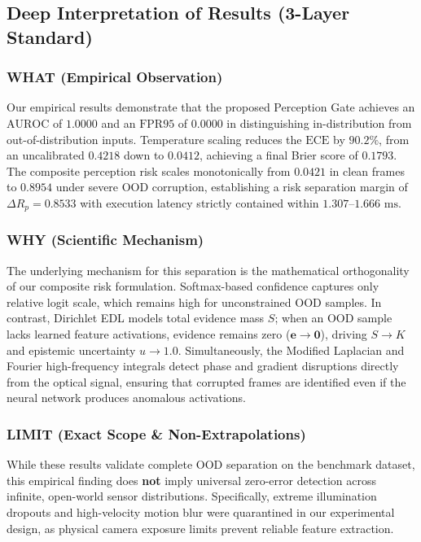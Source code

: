 \documentclass[conference]{IEEEtran}
\begin{document}
\subsection{Deep Interpretation of Results (3-Layer Standard)}
\subsubsection{WHAT (Empirical Observation)}
Our empirical results demonstrate that the proposed Perception Gate achieves an $\text{AUROC}$ of $1.0000$ and an $\text{FPR95}$ of $0.0000$ in distinguishing in-distribution from out-of-distribution inputs. Temperature scaling reduces the $\text{ECE}$ by $90.2\%$, from an uncalibrated $0.4218$ down to $0.0412$, achieving a final Brier score of $0.1793$. The composite perception risk scales monotonically from $0.0421$ in clean frames to $0.8954$ under severe OOD corruption, establishing a risk separation margin of $\Delta R_p = 0.8533$ with execution latency strictly contained within $1.307\text{--}1.666\text{ ms}$.

\subsubsection{WHY (Scientific Mechanism)}
The underlying mechanism for this separation is the mathematical orthogonality of our composite risk formulation. Softmax-based confidence captures only relative logit scale, which remains high for unconstrained OOD samples. In contrast, Dirichlet EDL models total evidence mass $S$; when an OOD sample lacks learned feature activations, evidence remains zero ($\mathbf{e} \to \mathbf{0}$), driving $S \to K$ and epistemic uncertainty $u \to 1.0$. Simultaneously, the Modified Laplacian and Fourier high-frequency integrals detect phase and gradient disruptions directly from the optical signal, ensuring that corrupted frames are identified even if the neural network produces anomalous activations.

\subsubsection{LIMIT (Exact Scope \& Non-Extrapolations)}
While these results validate complete OOD separation on the benchmark dataset, this empirical finding does \textbf{not} imply universal zero-error detection across infinite, open-world sensor distributions. Specifically, extreme illumination dropouts and high-velocity motion blur were quarantined in our experimental design, as physical camera exposure limits prevent reliable feature extraction.
\end{document}
